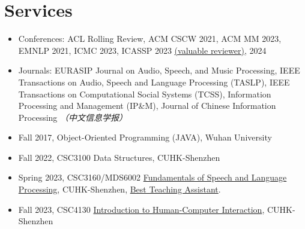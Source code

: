 \documentclass{resume}
\begin{document}
\section{Services}
\begin{itemize}
  \item Conferences: ACL Rolling Review, ACM CSCW 2021, ACM MM 2023, EMNLP 2021, ICMC 2023, ICASSP 2023
        \href{https://www.zhangxueyao.com/data/presentations/2023_icassp_reviewer.pdf}{(valuable
          reviewer)}, 2024
  \item Journals: EURASIP Journal on Audio, Speech, and Music Processing, IEEE
        Transactions on Audio, Speech and Language Processing (TASLP), IEEE
        Transactions on Computational Social Systems (TCSS), Information Processing and
        Management (IP\&M), Journal of Chinese Information Processing \textit{（中文信息学报）}
\end{itemize}
\begin{itemize}
  \item Fall 2017, Object-Oriented Programming (JAVA), Wuhan University
  \item Fall 2022, CSC3100 Data Structures, CUHK-Shenzhen
  \item Spring 2023, CSC3160/MDS6002
        \href{https://drwuz.com/CSC3160/index.html}{Fundamentals of Speech and Language
          Processing}, CUHK-Shenzhen,
        \href{https://www.zhangxueyao.com/data/presentations/20230521_ta_award.pdf}{Best
          Teaching Assistant}.
  \item Fall 2023, CSC4130 \href{https://stevenhan1991.github.io/CSC4130/index.html}{Introduction to Human-Computer Interaction}, CUHK-Shenzhen
\end{itemize}
\end{document}

